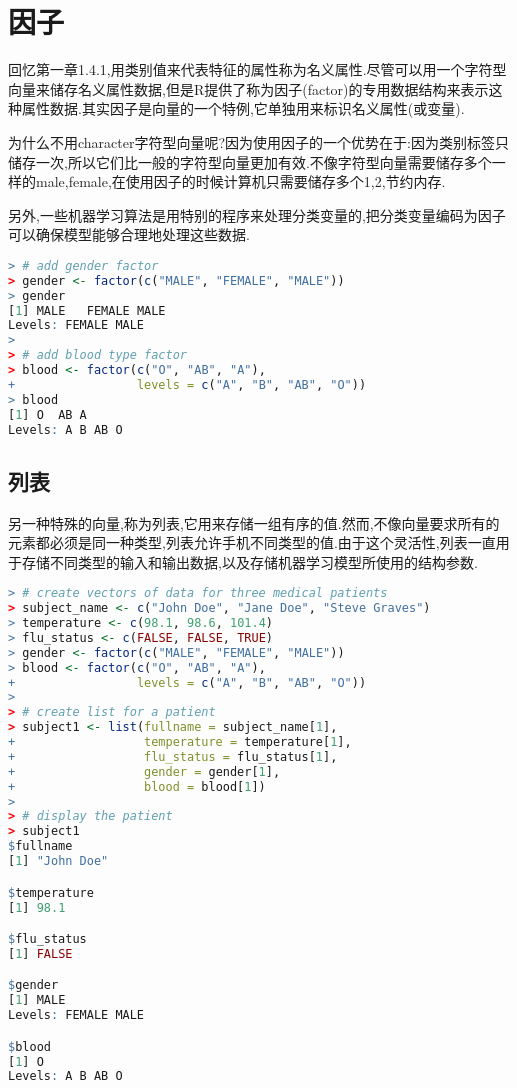 \documentclass[11pt,a4paper,oneside]{book}
\begin{document}
\section{因子}
回忆第一章1.4.1,用类别值来代表特征的属性称为名义属性.尽管可以用一个字符型向量来储存名义属性数据,但是R提供了称为因子(factor)的专用数据结构来表示这种属性数据.其实因子是向量的一个特例,它单独用来标识名义属性(或变量).

为什么不用character字符型向量呢?因为使用因子的一个优势在于:因为类别标签只储存一次,所以它们比一般的字符型向量更加有效.不像字符型向量需要储存多个一样的male,female,在使用因子的时候计算机只需要储存多个1,2,节约内存.

另外,一些机器学习算法是用特别的程序来处理分类变量的,把分类变量编码为因子可以确保模型能够合理地处理这些数据.

\begin{lstlisting}[language=r]
> # add gender factor
> gender <- factor(c("MALE", "FEMALE", "MALE"))
> gender
[1] MALE   FEMALE MALE  
Levels: FEMALE MALE
> 
> # add blood type factor
> blood <- factor(c("O", "AB", "A"),
+                 levels = c("A", "B", "AB", "O"))
> blood
[1] O  AB A 
Levels: A B AB O
\end{lstlisting}
\subsection{列表}
另一种特殊的向量,称为列表,它用来存储一组有序的值.然而,不像向量要求所有的元素都必须是同一种类型,列表允许手机不同类型的值.由于这个灵活性,列表一直用于存储不同类型的输入和输出数据,以及存储机器学习模型所使用的结构参数.
\begin{lstlisting}[language=r]
> # create vectors of data for three medical patients
> subject_name <- c("John Doe", "Jane Doe", "Steve Graves")
> temperature <- c(98.1, 98.6, 101.4)
> flu_status <- c(FALSE, FALSE, TRUE)
> gender <- factor(c("MALE", "FEMALE", "MALE"))
> blood <- factor(c("O", "AB", "A"),
+                 levels = c("A", "B", "AB", "O"))
> 
> # create list for a patient
> subject1 <- list(fullname = subject_name[1], 
+                  temperature = temperature[1],
+                  flu_status = flu_status[1],
+                  gender = gender[1],
+                  blood = blood[1])
> 
> # display the patient
> subject1
$fullname
[1] "John Doe"

$temperature
[1] 98.1

$flu_status
[1] FALSE

$gender
[1] MALE
Levels: FEMALE MALE

$blood
[1] O
Levels: A B AB O
\end{lstlisting}
\end{document}
